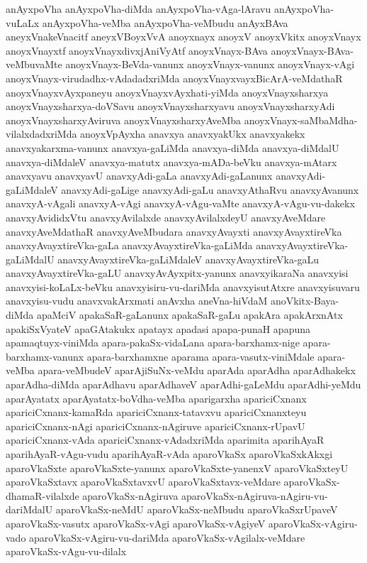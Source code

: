 {anAyxpoVha
anAyxpoVha-diMda
anAyxpoVha-vAga-lAravu
anAyxpoVha-vuLaLx
anAyxpoVha-veMba
anAyxpoVha-veMbudu
anAyxBAva
aneyxVnakeVnacitf
aneyxVBoyxVvA
anoyxnayx
anoyxV
anoyxVkitx
anoyxVnayx
anoyxVnayxtf
anoyxVnayxdivxjAniVyAtf
anoyxVnayx-BAva
anoyxVnayx-BAva-veMbuvaMte
anoyxVnayx-BeVda-vanunx
anoyxVnayx-vanunx
anoyxVnayx-vAgi
anoyxVnayx-virudadhx-vAdadadxriMda
anoyxVnayxvayxBicArA-veMdathaR
anoyxVnayxvAyxpaneyu
anoyxVnayxvAyxhati-yiMda
anoyxVnayxsharxya
anoyxVnayxsharxya-doVSavu
anoyxVnayxsharxyavu
anoyxVnayxsharxyAdi
anoyxVnayxsharxyAviruva
anoyxVnayxsharxyAveMba
anoyxVnayx-saMbaMdha-vilalxdadxriMda
anoyxVpAyxha
anavxya
anavxyakUkx
anavxyakekx
anavxyakarxma-vanunx
anavxya-gaLiMda
anavxya-diMda
anavxya-diMdalU
anavxya-diMdaleV
anavxya-matutx
anavxya-mADa-beVku
anavxya-mAtarx
anavxyavu
anavxyavU
anavxyAdi-gaLa
anavxyAdi-gaLanunx
anavxyAdi-gaLiMdaleV
anavxyAdi-gaLige
anavxyAdi-gaLu
anavxyAthaRvu
anavxyAvanunx
anavxyA-vAgali
anavxyA-vAgi
anavxyA-vAgu-vaMte
anavxyA-vAgu-vu-dakekx
anavxyAvididxVtu
anavxyAvilalxde
anavxyAvilalxdeyU
anavxyAveMdare
anavxyAveMdathaR
anavxyAveMbudara
anavxyAvayxti
anavxyAvayxtireVka
anavxyAvayxtireVka-gaLa
anavxyAvayxtireVka-gaLiMda
anavxyAvayxtireVka-gaLiMdalU
anavxyAvayxtireVka-gaLiMdaleV
anavxyAvayxtireVka-gaLu
anavxyAvayxtireVka-gaLU
anavxyAvAyxpitx-yanunx
anavxyikaraNa
anavxyisi
anavxyisi-koLaLx-beVku
anavxyisiru-vu-dariMda
anavxyisutAtxre
anavxyisuvaru
anavxyisu-vudu
anavxvakArxmati
anAvxha
aneVna-hiVdaM
anoVkitx-Baya-diMda
apaMciV
apakaSaR-gaLanunx
apakaSaR-gaLu
apakAra
apakArxnAtx
apakiSxVyateV
apaGAtakukx
apatayx
apadasi
apapa-punaH
apapuna
apamaqtuyx-viniMda
apara-pakaSx-vidaLana
apara-barxhamx-nige
apara-barxhamx-vanunx
apara-barxhamxne
aparama
apara-vasutx-viniMdale
apara-veMba
apara-veMbudeV
aparAjiSuNx-veMdu
aparAda
aparAdha
aparAdhakekx
aparAdha-diMda
aparAdhavu
aparAdhaveV
aparAdhi-gaLeMdu
aparAdhi-yeMdu
aparAyatatx
aparAyatatx-boVdha-veMba
aparigarxha
apariciCxnanx
apariciCxnanx-kamaRda
apariciCxnanx-tatavxvu
apariciCxnanxteyu
apariciCxnanx-nAgi
apariciCxnanx-nAgiruve
apariciCxnanx-rUpavU
apariciCxnanx-vAda
apariciCxnanx-vAdadxriMda
aparimita
aparihAyaR
aparihAyaR-vAgu-vudu
aparihAyaR-vAda
aparoVkaSx
aparoVkaSxkAkxgi
aparoVkaSxte
aparoVkaSxte-yanunx
aparoVkaSxte-yanenxV
aparoVkaSxteyU
aparoVkaSxtavx
aparoVkaSxtavxvU
aparoVkaSxtavx-veMdare
aparoVkaSx-dhamaR-vilalxde
aparoVkaSx-nAgiruva
aparoVkaSx-nAgiruva-nAgiru-vu-dariMdalU
aparoVkaSx-neMdU
aparoVkaSx-neMbudu
aparoVkaSxrUpaveV
aparoVkaSx-vasutx
aparoVkaSx-vAgi
aparoVkaSx-vAgiyeV
aparoVkaSx-vAgiru-vado
aparoVkaSx-vAgiru-vu-dariMda
aparoVkaSx-vAgilalx-veMdare
aparoVkaSx-vAgu-vu-dilalx
}
